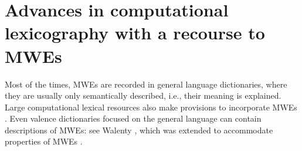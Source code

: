 \documentclass[output=paper,colorlinks,citecolor=brown]{langscibook}
\begin{document}


\section{%
Advances in computational lexicography with a recourse to MWEs} \label{sec:SOTA}
\begin{sloppypar}
Most of the times, MWEs are recorded in general language dictionaries, where they are usually only semantically described, i.e., their meaning is explained. Large computational lexical resources also make provisions to incorporate MWEs . Even valence dictionaries focused on the general language can contain descriptions of MWEs: see Walenty \citep{przepiorkowski-etal-2014-walenty}, which was extended to accommodate properties of MWEs \citep{przepiorkowski-etal-2014}. 
\end{sloppypar}
\end{document}
